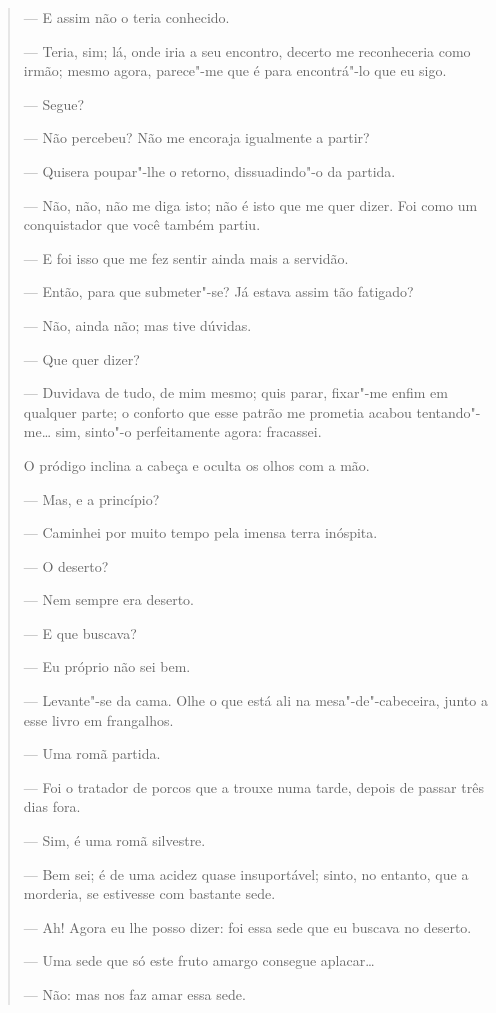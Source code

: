 \begin{quote}
--- E assim não o teria conhecido.

--- Teria, sim; lá, onde iria a seu encontro, decerto me reconheceria como
irmão; mesmo agora, parece"-me que é para encontrá"-lo que eu sigo.

--- Segue?

--- Não percebeu? Não me encoraja igualmente a partir?

--- Quisera poupar"-lhe o retorno, dissuadindo"-o da partida.

--- Não, não, não me diga isto; não é isto que me quer dizer. Foi como um
conquistador que você também partiu.

--- E foi isso que me fez sentir ainda mais a servidão.

--- Então, para que submeter"-se? Já estava assim tão fatigado?

--- Não, ainda não; mas tive dúvidas.

--- Que quer dizer?

--- Duvidava de tudo, de mim mesmo; quis parar, fixar"-me enfim em qualquer
parte; o conforto que esse patrão me prometia acabou tentando"-me\ldots{}
sim, sinto"-o perfeitamente agora: fracassei.

O pródigo inclina a cabeça e oculta os olhos com a mão.

--- Mas, e a princípio?

--- Caminhei por muito tempo pela imensa terra inóspita.

--- O deserto?

--- Nem sempre era deserto.

--- E que buscava?

--- Eu próprio não sei bem.

--- Levante"-se da cama. Olhe o que está ali na mesa"-de"-cabeceira, junto a
esse livro em frangalhos.

--- Uma romã partida.

--- Foi o tratador de porcos que a trouxe numa tarde, depois de passar
três dias fora.

--- Sim, é uma romã silvestre.

--- Bem sei; é de uma acidez quase insuportável; sinto, no entanto, que a
morderia, se estivesse com bastante sede.

--- Ah! Agora eu lhe posso dizer: foi essa sede que eu buscava no deserto.

--- Uma sede que só este fruto amargo consegue aplacar\ldots{}

--- Não: mas nos faz amar essa sede.


\end{quote}
